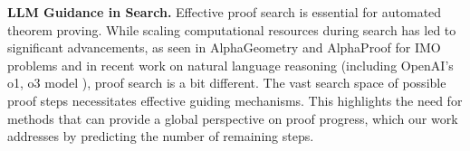 \textbf{LLM Guidance in Search.} Effective proof search is essential for automated theorem proving. While scaling computational resources during search has led to significant advancements, as seen in AlphaGeometry \citep{trinh2024solving} and AlphaProof \citep{alphaproof2024ai} for IMO problems and in recent work on natural language reasoning \citep{lightman2023let,yang2022generating, zhang2024rest,xie2024monte} (including OpenAI's o1, o3 model \citep{jaech2024openai, xu2025towards}), proof search is a bit different. The vast search space of possible proof steps necessitates effective guiding mechanisms. This highlights the need for methods that can provide a global perspective on proof progress, which our work addresses by predicting the number of remaining steps.
